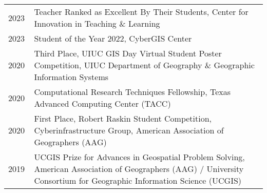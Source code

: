 \documentclass{acmcv}
\begin{document}
    \begin{longtable}{p{0.1\linewidth} p{0.9\linewidth}}

        2023 & Teacher Ranked as Excellent By Their Students,
        Center for Innovation in Teaching \& Learning\\

        2023 & Student of the Year 2022, CyberGIS Center\\

        2020 & Third Place, UIUC GIS Day Virtual Student Poster Competition, UIUC Department of Geography \& Geographic Information Systems \\

        2020 & Computational Research Techniques Fellowship, Texas Advanced Computing Center (TACC)\\

        2020 & First Place, Robert Raskin Student Competition, Cyberinfrastructure Group, American Association of Geographers (AAG) \\

        2019 & UCGIS Prize for Advances in Geospatial Problem Solving, American Association of Geographers (AAG) / University Consortium for Geographic Information Science (UCGIS)  \\





    \end{longtable}


\vspace*{0.25cm}
\end{document}
